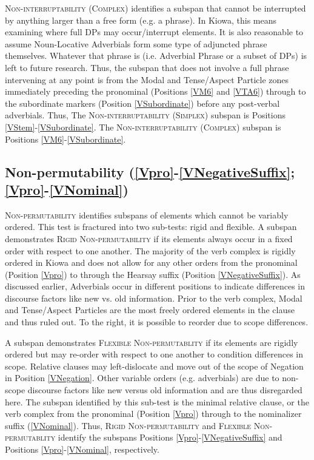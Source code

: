 \documentclass[output=paper]{langscibook}
\begin{document}
{\textsc{Non-interruptability (Complex)}} identifies a subspan that cannot be interrupted by anything larger than a free form (e.g. a phrase). In Kiowa, this means examining where full DPs may occur/interrupt elements. It is also reasonable to assume Noun-Locative Adverbials form some type of adjuncted phrase themselves. Whatever that phrase is (i.e. Adverbial Phrase or a subset of DPs) is left to future research. Thus, the subspan that does not involve a full phrase intervening at any point is from the Modal and Tense/Aspect Particle zones immediately preceding the pronominal (Positions \ref{VM6} and \ref{VTA6}) through to the subordinate markers (Position \ref{VSubordinate}) before any post-verbal adverbials. Thus, The {\textsc{Non-interruptability (Simplex)}} subspan is Positions \ref{VStem}-\ref{VSubordinate}. The {\textsc{Non-interruptability (Complex)}} subspan is Positions \ref{VM6}-\ref{VSubordinate}.

\subsection{Non-permutability (\ref{Vpro}-\ref{VNegativeSuffix}; \ref{Vpro}-\ref{VNominal})} \label{sec:non-permutability}

{\textsc{Non-permutability}} identifies subspans of elements which cannot be variably ordered. This test is fractured into two sub-tests: rigid and flexible. A subspan demonstrates {\textsc{Rigid Non-permutability}} if its elements always occur in a fixed order with respect to one another. The majority of the verb complex is rigidly ordered in Kiowa and does not allow for any other orders from the pronominal (Position \ref{Vpro}) to through the Hearsay suffix (Position \ref{VNegativeSuffix}). As discussed earlier, Adverbials occur in different positions to indicate differences in discourse factors like new vs. old information. Prior to the verb complex, Modal and Tense/Aspect Particles are the most freely ordered elements in the clause and thus ruled out. To the right, it is possible to reorder due to scope differences.

A subspan demonstrates {\textsc{Flexible Non-permutablity}} if its elements are rigid\-ly ordered but may re-order with respect to one another to condition differences in scope. Relative clauses may left-dislocate and move out of the scope of Negation in Position \ref{VNegation}. Other variable orders (e.g. adverbials) are due to non-scope discourse factors like new versus old information and are thus disregarded here. The subspan identified by this sub-test is the minimal relative clause, or the verb complex from the pronominal (Position \ref{Vpro}) through to the nominalizer suffix (\ref{VNominal}). Thus, {\textsc{Rigid Non-permutability}} and {\textsc{Flexible Non-permutablity}} identify the subspans Positions \ref{Vpro}-\ref{VNegativeSuffix} and Positions \ref{Vpro}-\ref{VNominal}, respectively.
\end{document}
